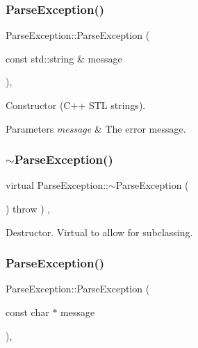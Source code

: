\subsubsection{\texorpdfstring{Parse\+Exception()}{ParseException()}\hspace{0.1cm}{\footnotesize\ttfamily [4/6]}}
{\footnotesize\ttfamily Parse\+Exception\+::\+Parse\+Exception (\begin{DoxyParamCaption}\item[{const std\+::string \&}]{message }\end{DoxyParamCaption})\hspace{0.3cm}{\ttfamily [inline]}, {\ttfamily [explicit]}}

Constructor (C++ S\+TL strings). 
\begin{DoxyParams}{Parameters}
{\em message} & The error message. \\
\hline
\end{DoxyParams}
\mbox{\label{classParseException_a59f11745728ad1ede341f2dda48e79b6}} 
\subsubsection{\texorpdfstring{$\sim$\+Parse\+Exception()}{~ParseException()}\hspace{0.1cm}{\footnotesize\ttfamily [2/3]}}
{\footnotesize\ttfamily virtual Parse\+Exception\+::$\sim$\+Parse\+Exception (\begin{DoxyParamCaption}{ }\end{DoxyParamCaption}) throw  ) \hspace{0.3cm}{\ttfamily [inline]}, {\ttfamily [virtual]}}

Destructor. Virtual to allow for subclassing. \mbox{\label{classParseException_a0e2db737183a1801d528102617ddc3c4}} 
\subsubsection{\texorpdfstring{Parse\+Exception()}{ParseException()}\hspace{0.1cm}{\footnotesize\ttfamily [5/6]}}
{\footnotesize\ttfamily Parse\+Exception\+::\+Parse\+Exception (\begin{DoxyParamCaption}\item[{const char $\ast$}]{message }\end{DoxyParamCaption})\hspace{0.3cm}{\ttfamily [inline]}, {\ttfamily [explicit]}}

